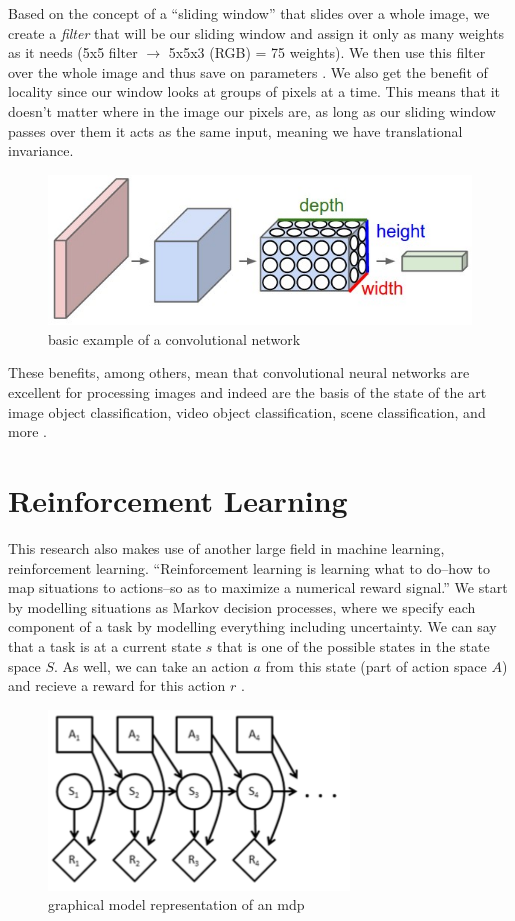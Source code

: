 \documentclass[letterpaper,12pt,titlepage,oneside,final]{book}
\begin{document}
Based on the concept of a ``sliding window'' that slides over a whole image, we create a \textit{filter} that will be our sliding window and assign it only as many weights as it needs (5x5 filter $\rightarrow$ 5x5x3 (RGB) = 75 weights). We then use this filter over the whole image and thus save on parameters \cite{cs231n}. We also get the benefit of locality since our window looks at groups of pixels at a time. This means that it doesn't matter where in the image our pixels are, as long as our sliding window passes over them it acts as the same input, meaning we have translational invariance.

\begin{figure}[b]
	\centering
	\includegraphics[scale=0.3]{conv}
	\caption{basic example of a convolutional network \cite{cs231n}}
\end{figure}

These benefits, among others, mean that convolutional neural networks are excellent for processing images and indeed are the basis of the state of the art image object classification, video object classification, scene classification, and more \cite{ILSVRC15} \cite{resnet}.


\section{Reinforcement Learning}
This research also makes use of another large field in machine learning, reinforcement learning. ``Reinforcement learning is learning what to do--how to map situations to actions--so as to maximize a numerical reward signal.'' \cite{sutton-barto} We start by modelling situations as Markov decision processes, where we specify each component of a task by modelling everything including uncertainty. We can say that a task is at a current state $s$ that is one of the possible states in the state space $S$. As well, we can take an action $a$ from this state (part of action space $A$) and recieve a reward for this action $r$ \cite{pascal-mdp}.


\begin{figure}[h]
	\centering
	\includegraphics[scale=1.0]{mdp}
	\caption{graphical model representation of an mdp\cite{pascal-mdp}}
\end{figure}
\end{document}
